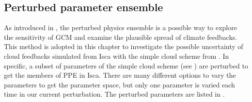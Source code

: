 
\subsection{Perturbed parameter ensemble}
\label{sec:PPE_setup}
 
 As introduced in , the perturbed physics ensemble is a possible way to explore the sensitivity of GCM and examine the plausible spread of climate feedbacks. This method is adopted in this chapter to investigate the possible uncertainty of cloud feedbacks simulated from Isca with the simple cloud scheme from . In specific, a subset of parameters of the simple cloud scheme (see ) are perturbed to get the members of PPE in Isca. There are many different options to vary the parameters to get the parameter space, but only one parameter is varied each time in our current perturbation. The perturbed parameters are listed in .
 
